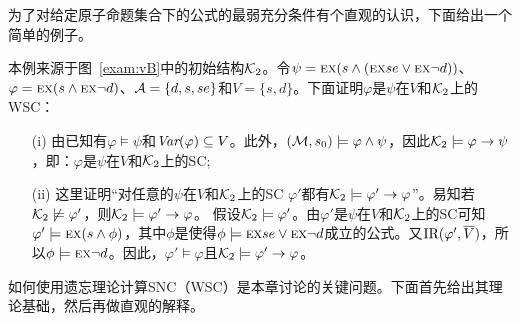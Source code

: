 为了对给定原子命题集合下的公式的最弱充分条件有个直观的认识，下面给出一个简单的例子。

\begin{example}\label{examp:WSC}
	本例来源于图~\ref{exam:vB}中的初始结构${\cal K}_2$。令$\psi = \textsc{e} \textsc{x}(s \wedge (\textsc{e} \textsc{x} se \vee \textsc{e} \textsc{x} \neg d))$、$\varphi = \textsc{e} \textsc{x}(s \wedge \textsc{e} \textsc{x} \neg d)$、${\cal A} =\{d, s, se\}$和$V = \{s, d\}$。下面证明$\varphi$是$\psi$在$V$和${\cal K}_2$上的WSC：
	\begin{itemize}
		\item[(i)] 由已知有$\varphi \models \psi$和$\textit{Var}(\varphi) \subseteq V$。此外，$({\cal M}, s_0) \models \varphi \wedge \psi$，因此${\cal K}_2 \models \varphi \rightarrow \psi$，即：$\varphi$是$\psi$在$V$和${\cal K}_2$上的SC;
		\item[(ii)] 这里证明“对任意的$\psi$在$V$和${\cal K}_2$上的SC $\varphi'$都有${\cal K}_2 \models \varphi' \rightarrow \varphi$”。易知若${\cal K}_2 \not \models \varphi'$，则${\cal K}_2\models \varphi' \rightarrow \varphi$。
		假设${\cal K}_2 \models \varphi'$。由$\varphi'$是$\psi$在$V$和${\cal K}_2$上的SC可知$\varphi' \models \textsc{e} \textsc{x}(s \wedge \phi)$，其中$\phi$是使得$\phi\models \textsc{e} \textsc{x} se \vee \textsc{e} \textsc{x} \neg d$成立的公式。又$\textrm{IR}(\varphi', \overline V)$，所以$\phi \models \textsc{e} \textsc{x} \neg d$。因此，$\varphi' \models \varphi$且${\cal K}_2 \models \varphi' \rightarrow \varphi$。
	\end{itemize}
\end{example}


如何使用遗忘理论计算SNC（WSC）是本章讨论的关键问题。下面首先给出其理论基础，然后再做直观的解释。

